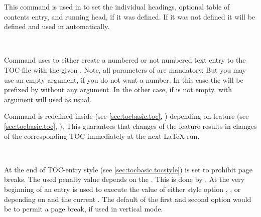 \begin{Declaration}
\end{Declaration}
%
This command is used in  to set the individual
headings, optional table of contents entry, and running head, if it was
defined. If it was not defined it will be defined and used in
 automatically.
%

\begin{Declaration}
  \\
\end{Declaration}
%
%
Command 
uses  to either create a numbered or not numbered text
entry to the TOC-file with the given . Note, all parameters
of  are mandatory. But you may use an empty
 argument, if you do not want a number. In this case the
 will be prefixed by  without any argument. In
the other case, if  is not empty,  with
argument  will used as usual.

Command  is redefined inside  (see
\autoref{sec:tocbasic.toc}, )
depending on feature  (see \autoref{sec:tocbasic.toc},
). This guarantees that changes of the
feature results in changes of the corresponding TOC immediately at the next
\LaTeX{} run.%
%
%

\begin{Declaration}
  \\
\end{Declaration}
%
%
At the end of TOC-entry style
 (see \autoref{sec:tocbasic.tocstyle})  is set
to prohibit page breaks. The used penalty value depends on the . This is done by . At the very
beginning of an entry  is used to
execute the value of either style option ,
, or  depending on
 and the current . The default of the
first and second option would be to permit a page break, if used in vertical
mode.

